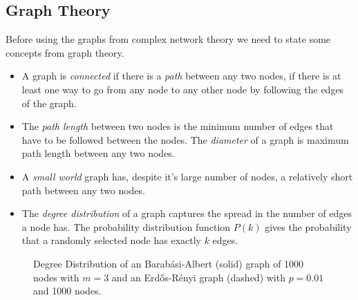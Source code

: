 \documentclass{article}
\begin{document}
\subsection{Graph Theory}
Before using the graphs from complex network theory we need to state some concepts from graph theory.
\begin{itemize}
   \item{}
        A graph is {\it connected} if there is a {\it path} between any two nodes, if there is at least one way to go from any node to any other node by following the edges of the graph.
   \item{}
        The {\it path length} between two nodes is the minimum number of edges that have to be followed between the nodes. The {\it diameter} of a graph is maximum path length between any two nodes.
   \item{}
        A {\it small world} graph has, despite it's large number of nodes, a relatively short path between any two nodes.
   \item{}
        The {\it degree distribution} of a graph captures the spread in the number of edges a node has.
        The probability distribution function $P(k)$ gives the probability that a randomly selected node has exactly $k$ edges.
\end{itemize}

\begin{figure}[thp]
   \centerline{
              } 
   \caption{Degree Distribution of an Barab\'{a}si-Albert (solid) graph of 1000 nodes with $m=3$ and an Erd\H os-R\'{e}nyi graph (dashed) with $p=0.01$ and 1000 nodes. }
   \label{fig_degree_distribution}
\end{figure}

\end{document}
